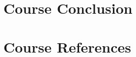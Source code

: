 \section[Conclusion]{Course Conclusion}









\section[References]{Course References}











